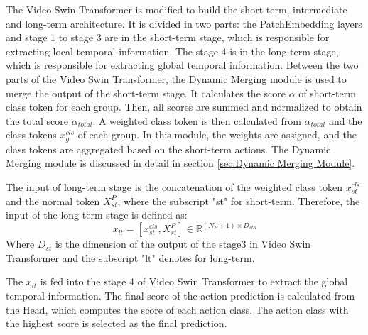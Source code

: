 The Video Swin Transformer is modified to build the short-term, intermediate and long-term architecture. It is divided in two parts: the PatchEmbedding layers and stage 1 to stage 3 are in the short-term stage, which is responsible for extracting local temporal information. The stage 4 is in the long-term stage, which is responsible for extracting global temporal information. Between the two parts of the Video Swin Transformer, the Dynamic Merging module is used to merge the output of the short-term stage. It calculates the score $\alpha$ of short-term class token for each group. Then, all scores are summed and normalized to obtain the total score $\alpha_{total}$. A weighted class token is then calculated from $\alpha_{total}$ and the class tokens $x^{cls}_g$ of each group. In this module, the weights are assigned, and the class tokens are aggregated based on the short-term actions. The Dynamic Merging module is discussed in detail in section \ref{sec:Dynamic Merging Module}.

The input of long-term stage is the concatenation of the weighted class token $x^{cls}_{st}$ and the normal token $X^{P}_{st}$, where the subscript "st" for short-term. Therefore, the input of the long-term stage is defined as:
\begin{equation}
    x_{lt} = [x^{cls}_{st}, X^{P}_{st}] \in \mathbb{R}^{(N_P + 1) \times D_{st3}}
    \label{eq:input_long_term}
\end{equation}
Where $D_{st}$ is the dimension of the output of the stage3 in Video Swin Transformer and the subscript "lt" denotes for long-term. 

The $x_{lt}$ is fed into the stage 4 of Video Swin Transformer to extract the global temporal information. The final score of the action prediction is calculated from the Head, which computes the score of each action class. The action class with the highest score is selected as the final prediction.

